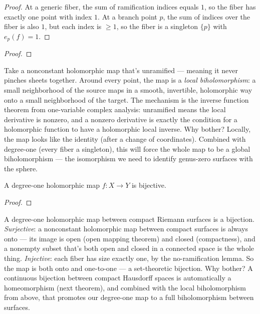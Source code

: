 \begin{proof}\leanok
At a generic fiber, the sum of ramification indices equals \(1\), so the
fiber has exactly one point with index \(1\). At a branch point \(p\),
the sum of indices over the fiber is also \(1\), but each index is
\(\ge 1\), so the fiber is a singleton \(\{p\}\) with \(e_p(f)=1\).
\end{proof}


\begin{proof}\leanok\end{proof}

\begin{layman}
Take a nonconstant holomorphic map that's unramified --- meaning it never
pinches sheets together. Around every point, the map is a \emph{local
biholomorphism}: a small neighborhood of the source maps in a smooth,
invertible, holomorphic way onto a small neighborhood of the target.
The mechanism is the inverse function theorem from one-variable complex
analysis: unramified means the local derivative is nonzero, and a
nonzero derivative is exactly the condition for a holomorphic function
to have a holomorphic local inverse. Why bother? Locally, the map looks
like the identity (after a change of coordinates). Combined with
degree-one (every fiber a singleton), this will force the whole map to
be a global biholomorphism --- the isomorphism we need to identify
genus-zero surfaces with the sphere.
\end{layman}

\begin{theorem}
\label{thm:degree-one-bijective}
A degree-one holomorphic map \(f:X\to Y\) is bijective.
\leanok
\end{theorem}
\begin{proof}\leanok\end{proof}

\begin{layman}
A degree-one holomorphic map between compact Riemann surfaces is a
bijection. \emph{Surjective}: a nonconstant holomorphic map between
compact surfaces is always onto --- its image is open (open mapping
theorem) and closed (compactness), and a nonempty subset that's both
open and closed in a connected space is the whole thing. \emph{Injective}:
each fiber has size exactly one, by the no-ramification lemma. So the
map is both onto and one-to-one --- a set-theoretic bijection. Why bother?
A continuous bijection between compact Hausdorff spaces is automatically
a homeomorphism (next theorem), and combined with the local
biholomorphism from above, that promotes our degree-one map to a full
biholomorphism between surfaces.
\end{layman}

